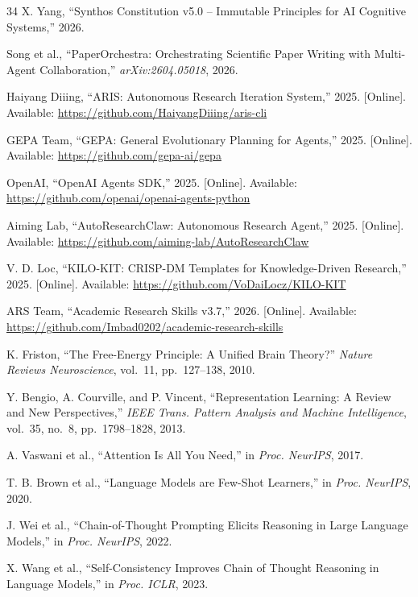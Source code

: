 \documentclass[review]{elsarticle}
\begin{document}
\begin{thebibliography}{34}
X. Yang, ``Synthos Constitution v5.0 -- Immutable Principles for AI Cognitive Systems,'' 2026.

Song et al., ``PaperOrchestra: Orchestrating Scientific Paper Writing with Multi-Agent Collaboration,'' \textit{arXiv:2604.05018}, 2026.

Haiyang Diiing, ``ARIS: Autonomous Research Iteration System,'' 2025. [Online]. Available: \url{https://github.com/HaiyangDiiing/aris-cli}

GEPA Team, ``GEPA: General Evolutionary Planning for Agents,'' 2025. [Online]. Available: \url{https://github.com/gepa-ai/gepa}

OpenAI, ``OpenAI Agents SDK,'' 2025. [Online]. Available: \url{https://github.com/openai/openai-agents-python}

Aiming Lab, ``AutoResearchClaw: Autonomous Research Agent,'' 2025. [Online]. Available: \url{https://github.com/aiming-lab/AutoResearchClaw}

V. D. Loc, ``KILO-KIT: CRISP-DM Templates for Knowledge-Driven Research,'' 2025. [Online]. Available: \url{https://github.com/VoDaiLocz/KILO-KIT}

ARS Team, ``Academic Research Skills v3.7,'' 2026. [Online]. Available: \url{https://github.com/Imbad0202/academic-research-skills}

K. Friston, ``The Free-Energy Principle: A Unified Brain Theory?'' \textit{Nature Reviews Neuroscience}, vol.~11, pp.~127--138, 2010.

Y. Bengio, A. Courville, and P. Vincent, ``Representation Learning: A Review and New Perspectives,'' \textit{IEEE Trans. Pattern Analysis and Machine Intelligence}, vol.~35, no.~8, pp.~1798--1828, 2013.

A. Vaswani et al., ``Attention Is All You Need,'' in \textit{Proc. NeurIPS}, 2017.

T. B. Brown et al., ``Language Models are Few-Shot Learners,'' in \textit{Proc. NeurIPS}, 2020.

J. Wei et al., ``Chain-of-Thought Prompting Elicits Reasoning in Large Language Models,'' in \textit{Proc. NeurIPS}, 2022.

X. Wang et al., ``Self-Consistency Improves Chain of Thought Reasoning in Language Models,'' in \textit{Proc. ICLR}, 2023.


\end{thebibliography}
\end{document}
